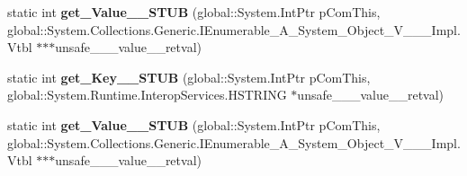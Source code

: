 \begin{DoxyCompactItemize}
static int {\bfseries get\+\_\+\+Value\+\_\+\+\_\+\+S\+T\+UB} (global\+::\+System.\+Int\+Ptr p\+Com\+This, global\+::\+System.\+Collections.\+Generic.\+I\+Enumerable\+\_\+\+A\+\_\+\+System\+\_\+\+Object\+\_\+\+V\+\_\+\+\_\+\+\_\+\+Impl.\+Vtbl $\ast$$\ast$$\ast$unsafe\+\_\+\+\_\+\+\_\+value\+\_\+\+\_\+retval)
\item 
\mbox{\label{struct_system_1_1_collections_1_1_generic_1_1_key_value_pair___a__string__j___system___collectiob611aa8205ecce9d7fe907374986c9f4_ab24c4d2ac8f23946c67b524ad7be63f1}} 
static int {\bfseries get\+\_\+\+Key\+\_\+\+\_\+\+S\+T\+UB} (global\+::\+System.\+Int\+Ptr p\+Com\+This, global\+::\+System.\+Runtime.\+Interop\+Services.\+H\+S\+T\+R\+I\+NG $\ast$unsafe\+\_\+\+\_\+\+\_\+value\+\_\+\+\_\+retval)
\item 
\mbox{\label{struct_system_1_1_collections_1_1_generic_1_1_key_value_pair___a__string__j___system___collectiob611aa8205ecce9d7fe907374986c9f4_a31033e5454134ce392b2f5c4c5c5a91c}} 
static int {\bfseries get\+\_\+\+Value\+\_\+\+\_\+\+S\+T\+UB} (global\+::\+System.\+Int\+Ptr p\+Com\+This, global\+::\+System.\+Collections.\+Generic.\+I\+Enumerable\+\_\+\+A\+\_\+\+System\+\_\+\+Object\+\_\+\+V\+\_\+\+\_\+\+\_\+\+Impl.\+Vtbl $\ast$$\ast$$\ast$unsafe\+\_\+\+\_\+\+\_\+value\+\_\+\+\_\+retval)
\end{DoxyCompactItemize}
